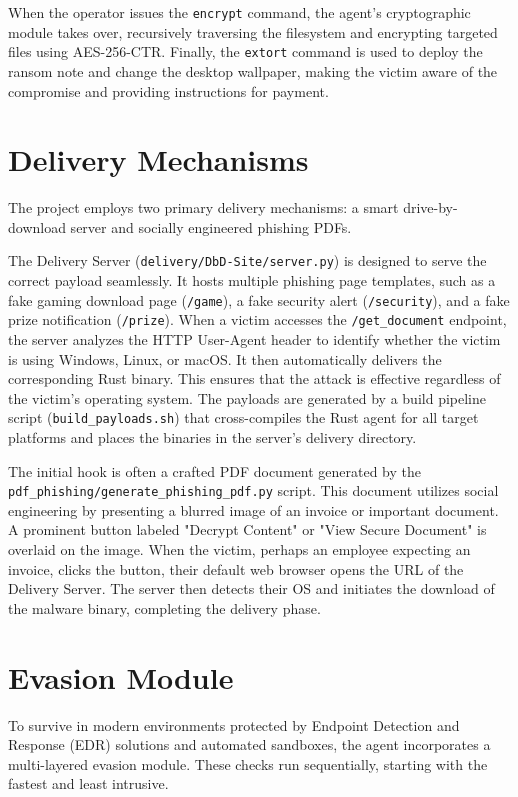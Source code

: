 \documentclass[12pt,a4paper]{article}
\newcommand{\code}[1]{\texttt{\textcolor{primaryblue}{#1}}}
\begin{document}
When the operator issues the \code{encrypt} command, the agent's cryptographic module takes over, recursively traversing the filesystem and encrypting targeted files using AES-256-CTR. Finally, the \code{extort} command is used to deploy the ransom note and change the desktop wallpaper, making the victim aware of the compromise and providing instructions for payment.

\section{Delivery Mechanisms}

The project employs two primary delivery mechanisms: a smart drive-by-download server and socially engineered phishing PDFs.

The Delivery Server (\code{delivery/DbD-Site/server.py}) is designed to serve the correct payload seamlessly. It hosts multiple phishing page templates, such as a fake gaming download page (\code{/game}), a fake security alert (\code{/security}), and a fake prize notification (\code{/prize}). When a victim accesses the \code{/get\_document} endpoint, the server analyzes the HTTP User-Agent header to identify whether the victim is using Windows, Linux, or macOS. It then automatically delivers the corresponding Rust binary. This ensures that the attack is effective regardless of the victim's operating system. The payloads are generated by a build pipeline script (\code{build\_payloads.sh}) that cross-compiles the Rust agent for all target platforms and places the binaries in the server's delivery directory.

The initial hook is often a crafted PDF document generated by the \code{pdf\_phishing/generate\_phishing\_pdf.py} script. This document utilizes social engineering by presenting a blurred image of an invoice or important document. A prominent button labeled "Decrypt Content" or "View Secure Document" is overlaid on the image. When the victim, perhaps an employee expecting an invoice, clicks the button, their default web browser opens the URL of the Delivery Server. The server then detects their OS and initiates the download of the malware binary, completing the delivery phase.

\section{Evasion Module}

To survive in modern environments protected by Endpoint Detection and Response (EDR) solutions and automated sandboxes, the agent incorporates a multi-layered evasion module. These checks run sequentially, starting with the fastest and least intrusive.
\end{document}
